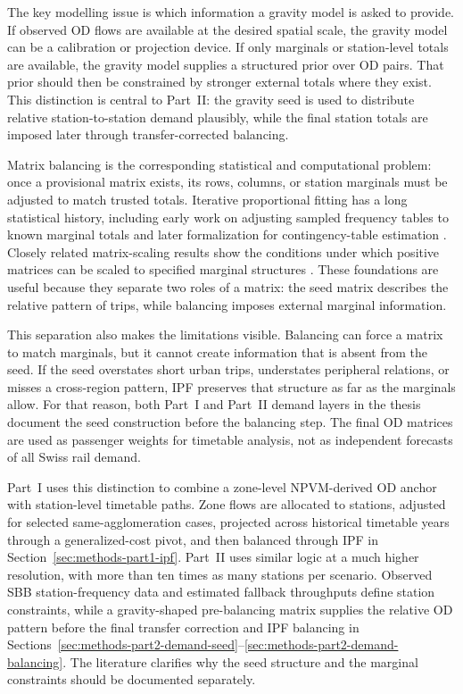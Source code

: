 \documentclass[preprint,12pt]{elsarticle}
\begin{document}
The key modelling issue is which information a gravity model is asked to provide. If observed OD flows are available at the desired spatial scale, the gravity model can be a calibration or projection device. If only marginals or station-level totals are available, the gravity model supplies a structured prior over OD pairs. That prior should then be constrained by stronger external totals where they exist. This distinction is central to Part~II: the gravity seed is used to distribute relative station-to-station demand plausibly, while the final station totals are imposed later through transfer-corrected balancing.

Matrix balancing is the corresponding statistical and computational problem: once a provisional matrix exists, its rows, columns, or station marginals must be adjusted to match trusted totals. Iterative proportional fitting has a long statistical history, including early work on adjusting sampled frequency tables to known marginal totals \citep{demingStephan1940IPF} and later formalization for contingency-table estimation \citep{fienberg1970IPF}. Closely related matrix-scaling results show the conditions under which positive matrices can be scaled to specified marginal structures \citep{sinkhorn1964MatrixScaling}. These foundations are useful because they separate two roles of a matrix: the seed matrix describes the relative pattern of trips, while balancing imposes external marginal information.

This separation also makes the limitations visible. Balancing can force a matrix to match marginals, but it cannot create information that is absent from the seed. If the seed overstates short urban trips, understates peripheral relations, or misses a cross-region pattern, IPF preserves that structure as far as the marginals allow. For that reason, both Part~I and Part~II demand layers in the thesis document the seed construction before the balancing step. The final OD matrices are used as passenger weights for timetable analysis, not as independent forecasts of all Swiss rail demand.

Part~I uses this distinction to combine a zone-level NPVM-derived OD anchor with station-level timetable paths. Zone flows are allocated to stations, adjusted for selected same-agglomeration cases, projected across historical timetable years through a generalized-cost pivot, and then balanced through IPF in Section~\ref{sec:methods-part1-ipf}. Part~II uses similar logic at a much higher resolution, with more than ten times as many stations per scenario. Observed SBB station-frequency data and estimated fallback throughputs define station constraints, while a gravity-shaped pre-balancing matrix supplies the relative OD pattern before the final transfer correction and IPF balancing in Sections~\ref{sec:methods-part2-demand-seed}--\ref{sec:methods-part2-demand-balancing}. The literature clarifies why the seed structure and the marginal constraints should be documented separately.
\end{document}
